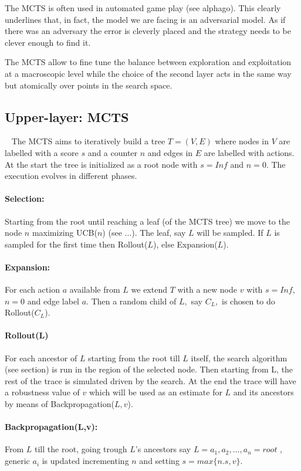 \documentclass[11pt]{article}
\begin{document}
The MCTS is often used in automated game play (see alphago). This clearly underlines that, in fact, the model we are facing is an adversarial model. As if there was an adversary the error is cleverly placed and the strategy needs to be clever enough to find it. 

The MCTS allow to fine tune the balance between exploration and exploitation at a macroscopic level while the choice of the second layer acts in the same way but atomically over points in the search space.

\subsection{Upper-layer: MCTS}~\label{sec:MCTS}
The MCTS aims to iteratively build a tree $T=(V,E)$ where nodes in $V$ are labelled with a score $s$ and a counter $n$ and edges in $E$ are labelled with actions. At the start the tree is initialized as a root node with $s=Inf$ and $n=0$. The execution evolves in different phases.

\paragraph{Selection:} Starting from the root until reaching a leaf (of the MCTS tree) we move to the node $n$ maximizing UCB($n$) (see ...). 
The leaf, say $L$ will be sampled. If $L$ is sampled for the first time then Rollout($L$), else Expansion($L$).

\paragraph{Expansion:} For each action $a$ available from $L$ we extend $T$ with a new node $v $  with $s=Inf$, $n=0$ and edge label $a$. Then a random child of $L,$ say $C_L,$ is chosen to do Rollout($C_L$).

\paragraph{Rollout(L)} For each ancestor of $L$ starting from the root till $L$ itself, the search algorithm (see section) is run in the region of the selected node. Then starting from L, the rest of the trace is simulated driven by the search. At the end the trace will have a robustness value of $v$ which will be used as an estimate for $L$ and its ancestors by means of Backpropagation($L,v$).

\paragraph{Backpropagation(L,v):} From $L$ till the root, going trough $L$'s ancestors say $L=a_1, a_2, \dots, a_n=root$ , generic $a_i$ is updated incrementing $n$ and setting $s=max\{n.s, v\}$.
\end{document}
